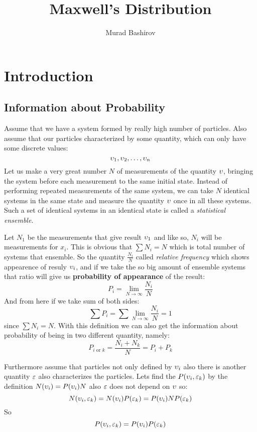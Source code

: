 \documentclass[a4paper, 12pt]{article}
\title{Maxwell's Distribution}
\author{Murad Bashirov}
\date{}
\begin{document}
\begin{titlepage}
    \maketitle
    \tableofcontents
\end{titlepage}
\section{Introduction}
\subsection{Information about Probability}
Assume that we have a system formed  by really high number of particles.
Also assume that our particles characterized by some quantity, which can only have some discrete values:
$$\upsilon_1,\upsilon_2,\ldots,\upsilon_n$$
Let us make a very great number $N$ of measurements of the quantity $\upsilon$, bringing the system before 
each measurement to the same initial state. Instead of performing repeated measurements of the
same system, we can take $N$ identical systems in the same state and measure the quantity 
$\upsilon$ once in all these systems. Such a set of identical systems in an identical state is called a 
\emph{statistical ensemble}.

Let $N_1$ be the measurements that give result $\upsilon_1$ and like so, $N_i$ will be measurements for $x_i$.
This is obvious that $\sum N_i = N$ which is total number of systems that ensemble. So the quantity $\frac{N_i}{N}$ called 
\emph{relative frequency} which shows appearence of resuly $\upsilon_i$, and if we take the so big amount of ensemble systems
that ratio will give us \textbf{probability of appearance} of the result: $$P_i=\lim_{N\to\infty}\frac{N_i}{N}$$
And from here if we take sum of both sides:$$\sum P_i =\sum \lim_{N\to\infty}\frac{N_i}{N}=1$$
since $\sum N_i =N$. With this definition we can also get the information about probability of being in two different quantity, namely:
$$P_{i\text{ or }k}=\frac{N_i+N_k}{N}=P_i+P_k$$

Furthermore assume that particles not only defined by $\upsilon_i$ also there is another quantity $\varepsilon$ also characterizes the particles.
Lets find  the $P(\upsilon_i,\varepsilon_k )$ by the definition $N(\upsilon_i)=P(\upsilon_i)N$ also $\varepsilon$ does not depend on $\upsilon$ so:
$$N(\upsilon_i,\varepsilon_k)=N(\upsilon_i)P(\varepsilon_k)=P(\upsilon_i)NP(\varepsilon_k)$$
So \begin{equation} \label{eq:multiply}
    P(\upsilon_i,\varepsilon_k )=P(\upsilon_i)P(\varepsilon_k)
\end{equation}
\end{document}

